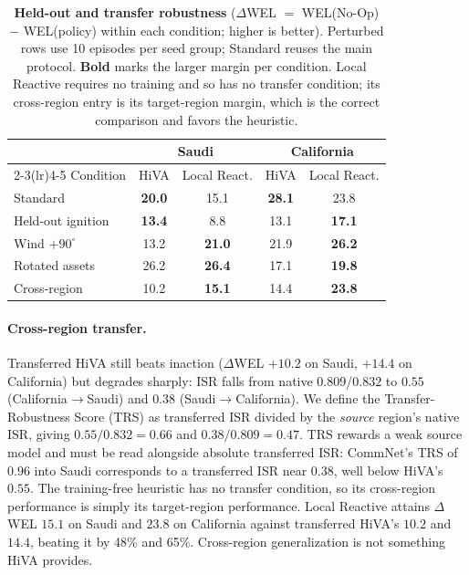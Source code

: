 \documentclass[letterpaper]{article}
\begin{document}
\begin{table}[t]
\centering
\caption{\textbf{Held-out and transfer robustness} ($\Delta$WEL $=$ WEL(No-Op) $-$ WEL(policy) within each condition; higher is better). Perturbed rows use 10 episodes per seed group; Standard reuses the main protocol. \textbf{Bold} marks the larger margin per condition. Local Reactive requires no training and so has no transfer condition; its cross-region entry is its target-region margin, which is the correct comparison and favors the heuristic.}
\label{tab:failure}
\vspace{0.5em}
\setlength{\tabcolsep}{4pt}\small
\begin{tabular}{lcccc}
\toprule
 & \multicolumn{2}{c}{Saudi} & \multicolumn{2}{c}{California} \\
\cmidrule(lr){2-3}\cmidrule(lr){4-5}
Condition & HiVA & Local React. & HiVA & Local React. \\
\midrule
Standard & \textbf{20.0} & 15.1 & \textbf{28.1} & 23.8 \\
Held-out ignition & \textbf{13.4} & 8.8 & 13.1 & \textbf{17.1} \\
Wind $+90^\circ$ & 13.2 & \textbf{21.0} & 21.9 & \textbf{26.2} \\
Rotated assets & 26.2 & \textbf{26.4} & 17.1 & \textbf{19.8} \\
Cross-region & 10.2 & \textbf{15.1} & 14.4 & \textbf{23.8} \\
\bottomrule
\end{tabular}
\end{table}

\paragraph{Cross-region transfer.} Transferred HiVA still beats inaction ($\Delta$WEL $+10.2$ on Saudi, $+14.4$ on California) but degrades sharply: ISR falls from native $0.809$/$0.832$ to $0.55$ (California$\rightarrow$Saudi) and $0.38$ (Saudi$\rightarrow$California). We define the Transfer-Robustness Score (TRS) as transferred ISR divided by the \emph{source} region's native ISR, giving $0.55/0.832 = 0.66$ and $0.38/0.809 = 0.47$. TRS rewards a weak source model and must be read alongside absolute transferred ISR: CommNet's TRS of $0.96$ into Saudi corresponds to a transferred ISR near $0.38$, well below HiVA's $0.55$. The training-free heuristic has no transfer condition, so its cross-region performance is simply its target-region performance. Local Reactive attains $\Delta$WEL $15.1$ on Saudi and $23.8$ on California against transferred HiVA's $10.2$ and $14.4$, beating it by 48\% and 65\%. Cross-region generalization is not something HiVA provides.
\end{document}
